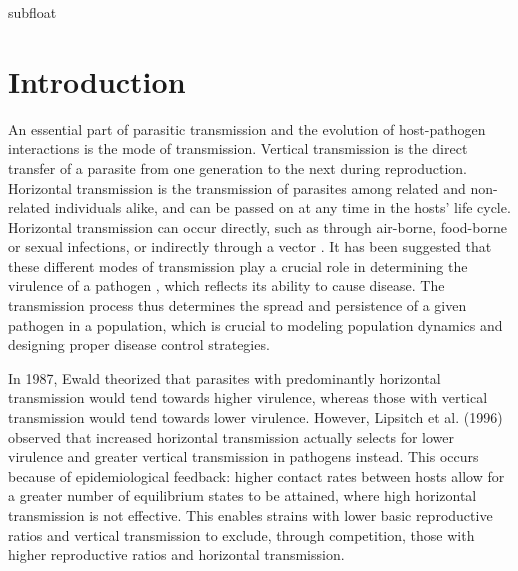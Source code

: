 subfloat\section{Introduction}
An essential part of parasitic transmission and the evolution of host-pathogen
interactions is the mode of transmission.
Vertical transmission is the direct transfer of a parasite from one generation
to the next during reproduction.
Horizontal transmission is the transmission of parasites among related and
non-related individuals alike, and can be passed on at any time in the hosts’
life cycle\supercite{Ebert:2013}.
Horizontal transmission can occur directly, such as through air-borne,
food-borne or sexual infections, or indirectly through a vector
\supercite{CHEN2006}.
It has been suggested that these different modes of transmission play a crucial
role in determining the virulence of a pathogen
\supercite{Clayton:1994,EWALD:2011}, which reflects its ability to cause
disease\supercite{PAYNE2017}.
The transmission process thus determines the spread and persistence of a given
pathogen in a population, which is crucial to modeling population dynamics and
designing proper disease control strategies.

In 1987, Ewald\supercite{Ewald:1987} theorized that parasites with predominantly
horizontal transmission would tend towards higher virulence, whereas those with
vertical transmission would tend towards lower virulence.
However, Lipsitch et al. (1996)\supercite{Lipsitch:1996} observed that increased
horizontal transmission actually selects for lower virulence and greater vertical
transmission in pathogens instead.
This occurs because of epidemiological feedback: higher contact rates between
hosts allow for a greater number of equilibrium states to be attained, where
high horizontal transmission is not effective\supercite{Lipsitch:1995}.
This enables strains with lower basic reproductive ratios and vertical
transmission to exclude, through competition, those with higher reproductive
ratios and horizontal transmission.

